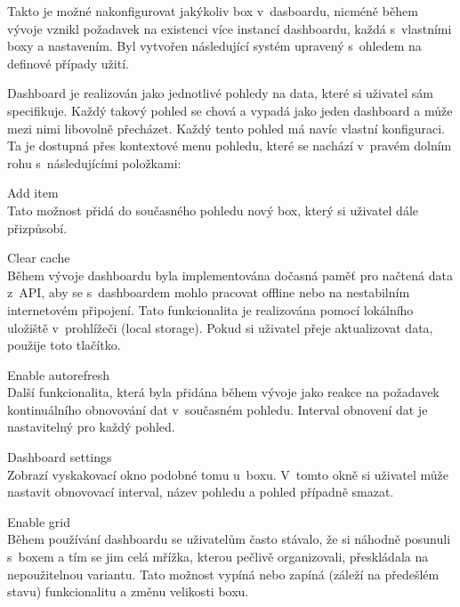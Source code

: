 Takto je možné nakonfigurovat jakýkoliv box v~dasboardu, nicméně během vývoje vznikl požadavek na existenci více instancí dashboardu, každá s~vlastními boxy a nastavením. Byl vytvořen následující systém upravený s~ohledem na definové případy užití.

Dashboard je realizován jako jednotlivé pohledy na data, které si uživatel sám specifikuje. Každý takový pohled se chová a vypadá jako jeden dashboard a může mezi nimi libovolně přecházet. Každý tento pohled má navíc vlastní konfiguraci. Ta je dostupná přes kontextové menu pohledu, které se nachází v~pravém dolním rohu s~následujícími položkami:

\begin{description}
    \item Add item \\
        Tato možnost přidá do současného pohledu nový box, který si uživatel dále přizpůsobí.

    \item Clear cache \\
        Během vývoje dashboardu byla implementována dočasná paměť pro načtená data z~API, aby se s~dashboardem mohlo pracovat offline nebo na nestabilním internetovém připojení. Tato funkcionalita je realizována pomocí lokálního uložiště v~prohlížeči (local storage). Pokud si uživatel přeje aktualizovat data, použije toto tlačítko. 

    \item Enable autorefresh \\
        Další funkcionalita, která byla přidána během vývoje jako reakce na požadavek kontinuálního obnovování dat v~současném pohledu. Interval obnovení dat je nastavitelný pro každý pohled.

    \item Dashboard settings \\
        Zobrazí vyskakovací okno podobné tomu u~boxu. V~tomto okně si uživatel může nastavit obnovovací interval, název pohledu a pohled případně smazat.
        
    \item Enable grid\\
        Během používání dashboardu se uživatelům často stávalo, že si náhodně posunuli s~boxem a tím se jim celá mřížka, kterou pečlivě organizovali, přeskládala na nepoužitelnou variantu. Tato možnost vypíná nebo zapíná (záleží na předešlém stavu)  funkcionalitu a změnu velikosti boxu.
\end{description}

